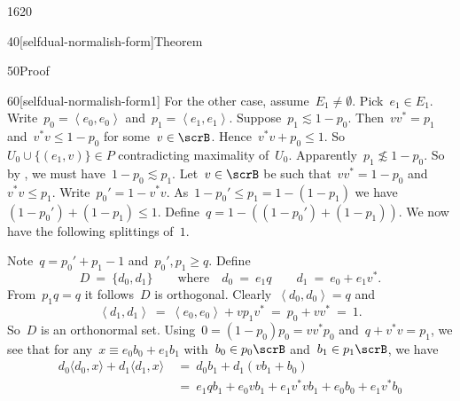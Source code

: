 \begin{parsec}{1620}
\begin{point}{40}[selfdual-normalish-form]{Theorem}
\begin{point}{50}{Proof}
\begin{point}{60}[selfdual-normalish-form1]
For the other case, assume~$E_1 \neq \emptyset$.
Pick~$e_1 \in E_1$.
Write~$p_0 = \left<e_0,e_0\right>$
    and~$p_1 = \left<e_1,e_1\right>$.
Suppose~$p_1 \lesssim 1 - p_0$.
Then~$vv^* = p_1$ and~$v^*v \leq 1- p_0$ for some~$v \in \scrB$.
    Hence~$v^*v + p_0 \leq 1$.
    So~$U_0 \cup \{ (e_1, v) \} \in P$ contradicting maximality of~$U_0$.
Apparently~$p_1 \not\lesssim 1-p_0$.
So by , we must have~$1-p_0 \lesssim p_1$.
Let~$v \in \scrB$ be such that~$vv^*=1-p_0$
    and~$v^*v \leq p_1$.
Write~$p_0' = 1- v^*v$.
As~$1-p_0' \leq p_1 =1-(1-p_1)$
we have~$(1-p_0') + (1-p_1) \leq 1$.
Define~$q = 1- ((1-p_0') + (1-p_1))$.
We now have the following splittings of~$1$.
\begin{center}
\end{center}
Note~$q = p_0'+p_1 - 1$ and~$p_0', p_1 \geq q$.
Define
\begin{equation*}
    D \ = \ \{d_0, d_1\} \qquad \text{where} \quad
    d_0 \ =\   e_1 q \qquad
    d_1 \ = \ e_0 + e_1v^*.
\end{equation*}
From~$p_1q=q$ it follows~$D$ is orthogonal.
Clearly~$\left<d_0,d_0\right>=q$ and
\begin{equation*}
    \left<d_1, d_1\right>
        \ =\ \left<e_0, e_0\right> + vp_1v^*    
        \ =\ p_0 + vv^* \ =\ 1.
\end{equation*}
So~$D$ is an orthonormal set.
Using~$0 = (1-p_0)p_0 = vv^*p_0 $ and~$q+v^*v = p_1$, we see
that for any~$x \equiv e_0 b_0 + e_1 b_1$
with~$b_0 \in p_0\scrB$ and~$b_1 \in p_1 \scrB$, we have
\begin{align*}
    d_0 \langle d_0, x \rangle + d_1 \langle d_1 , x \rangle
    &\ = \ d_0 b_1 + d_1(vb_1 + b_0) \\
    &\ = \ e_1 q b_1 + e_0 vb_1 + e_1v^*vb_1 + e_0 b_0 + e_1v^* b_0 \\

\end{align*}
\end{point}
\end{point}
\end{point}
\end{parsec}
